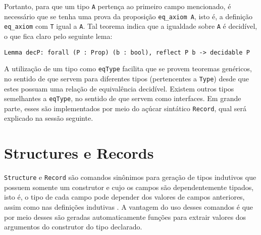 Portanto, para que um tipo \lstinline[language = coq]$A$
pertença ao primeiro campo mencionado, é necessário que se tenha uma prova da proposição \lstinline[language = coq]$eq_axiom A$, isto é, 
a definição \lstinline[language = coq]$eq_axiom$ com 
\lstinline[language = coq]$T$ igual a \lstinline[language = coq]$A$.
Tal teorema indica que a igualdade sobre \lstinline[language = coq]$A$
é decidível, o que fica claro pelo seguinte lema:

\begin{lstlisting}[language = coq]
    Lemma decP: forall (P : Prop) (b : bool), reflect P b -> decidable P
\end{lstlisting}

A utilização de um tipo como \lstinline[language = coq]$eqType$ facilita que se provem teoremas genéricos, no sentido de que servem para diferentes tipos (pertencentes a \lstinline[language = coq]$Type$) desde que estes possuam uma relação de equivalência decidível. Existem outros tipos semelhantes a \lstinline[language = coq]$eqType$, no sentido de que servem como interfaces. Em grande parte, esses são implementados por meio do açúcar sintático \lstinline[language = coq]$Record$, qual será explicado na sessão seguinte.

\section{Structures e Records} 
\label{section:structs-e-records}

\lstinline[language = coq]$Structure$ e \lstinline[language = coq]$Record$ são comandos sinônimos para geração de tipos indutivos que possuem somente um construtor e cujo os campos são dependentemente tipados, isto é, o tipo de cada campo pode depender dos valores de campos anteriores, assim como nas definições indutivas \cite{assia_mahboubi_2022_7118596}. A vantagem do uso desses comandos é que por meio desses são geradas automaticamente funções para extrair valores dos argumentos do construtor do tipo declarado.

